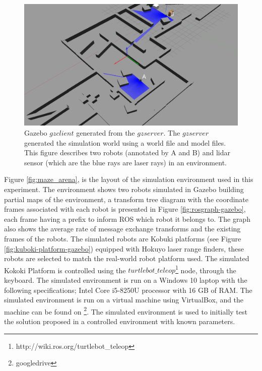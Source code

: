 \begin{figure}[H]
    \centering
    \includegraphics[width=1\textwidth]{figs/gazebo_environment.png}
    \caption{Gazebo \(gzclient\) generated from the \(gzserver\). The \(gzserver\) generated the simulation world using a world file and model files. This figure describes two robots (annotated by A and B) and lidar sensor (which are the blue rays are laser rays) in an environment.}
    \label{fig:gazebo-environment}
\end{figure}



Figure \ref{fig:maze_arena}, is the layout of the simulation environment used in this experiment. The environment shows two robots simulated in Gazebo building partial maps of the environment, a transform tree diagram with the coordinate frames associated with each robot is presented in Figure \ref{fig:rosgraph-gazebo}, each frame having a prefix to inform ROS which robot it belongs to. The graph also shows the average rate of message exchange transforms and the existing frames of the robots. The simulated robots are Kobuki platforms (see Figure \ref{fig:kuboki-platform-gazebo}) equipped with Hokuyo laser range finders, these robots are selected to match the real-world robot platform used. The simulated Kokoki Platform is controlled using the \(turtlebot\_teleop\)\footnote{http://wiki.ros.org/turtlebot\_teleop} node, through the keyboard. The simulated environment is run on a Windows 10 laptop with the following specifications; Intel Core i5-8250U processor with 16 GB of RAM. The simulated environment is run on a virtual machine using VirtualBox, and the machine can be found on \footnote{googledrive}. The simulated environment is used to initially test the solution proposed in a controlled environment with known parameters. 

